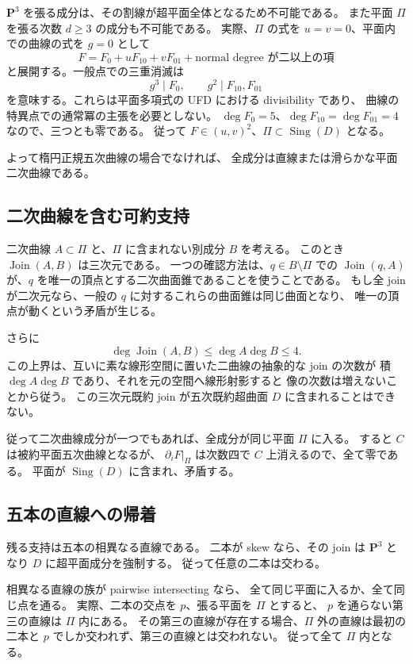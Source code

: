\documentclass[11pt,a4paper]{ltjsarticle}
\newcommand{\PP}{\mathbf P}\renewcommand{\AA}{\mathbf A}
\theoremstyle{remark}\newtheorem{remark}[theorem]{注意}
\begin{document}
$\PP^3$ を張る成分は、その割線が超平面全体となるため不可能である。
また平面 $\Pi$ を張る次数 $d\ge3$ の成分も不可能である。
実際、$\Pi$ の式を $u=v=0$、平面内での曲線の式を $g=0$ として
\[
F=F_0+uF_{10}+vF_{01}+\text{normal degree が二以上の項}
\]
と展開する。一般点での三重消滅は
\[
g^3\mid F_0,\qquad g^2\mid F_{10},F_{01}
\]
を意味する。これらは平面多項式の UFD における divisibility であり、
曲線の特異点での通常冪の主張を必要としない。
$\deg F_0=5$、$\deg F_{10}=\deg F_{01}=4$ なので、三つとも零である。
従って $F\in(u,v)^2$、$\Pi\subset\operatorname{Sing}(D)$ となる。

よって楕円正規五次曲線の場合でなければ、
全成分は直線または滑らかな平面二次曲線である。

\subsection{二次曲線を含む可約支持}

二次曲線 $A\subset\Pi$ と、$\Pi$ に含まれない別成分 $B$ を考える。
このとき $\operatorname{Join}(A,B)$ は三次元である。
一つの確認方法は、$q\in B\setminus\Pi$ での
$\operatorname{Join}(q,A)$ が、$q$ を唯一の頂点とする二次曲面錐であることを使うことである。
もし全 join が二次元なら、一般の $q$ に対するこれらの曲面錐は同じ曲面となり、
唯一の頂点が動くという矛盾が生じる。

さらに
\[
\deg\operatorname{Join}(A,B)\le\deg A\deg B\le4.
\]
この上界は、互いに素な線形空間に置いた二曲線の抽象的な join の次数が
積 $\deg A\deg B$ であり、それを元の空間へ線形射影すると
像の次数は増えないことから従う。
この三次元既約 join が五次既約超曲面 $D$ に含まれることはできない。

従って二次曲線成分が一つでもあれば、全成分が同じ平面 $\Pi$ に入る。
すると $C$ は被約平面五次曲線となるが、
$\partial_iF|_\Pi$ は次数四で $C$ 上消えるので、全て零である。
平面が $\operatorname{Sing}(D)$ に含まれ、矛盾する。

\subsection{五本の直線への帰着}

残る支持は五本の相異なる直線である。
二本が skew なら、その join は $\PP^3$ となり $D$ に超平面成分を強制する。
従って任意の二本は交わる。

相異なる直線の族が pairwise intersecting なら、
全て同じ平面に入るか、全て同じ点を通る。
実際、二本の交点を $p$、張る平面を $\Pi$ とすると、
$p$ を通らない第三の直線は $\Pi$ 内にある。
その第三の直線が存在する場合、$\Pi$ 外の直線は最初の二本と
$p$ でしか交われず、第三の直線とは交われない。
従って全て $\Pi$ 内となる。
\end{document}
